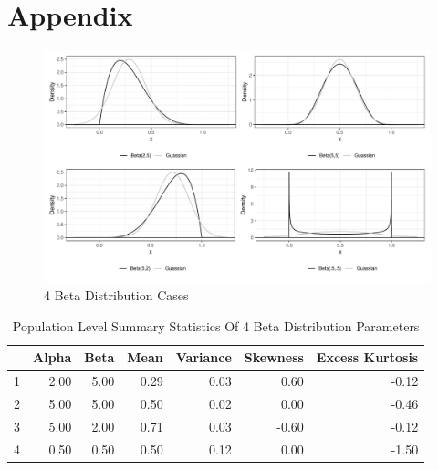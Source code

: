 \documentclass{article}\usepackage[]{graphicx}\usepackage[]{xcolor}
\begin{document}
\begin{multicols}{2}
\vspace{1em}


\begin{tiny}

\end{tiny}
\end{multicols}

\newpage
\onecolumn
\section{Appendix}

\begin{figure}[H]
  \begin{center}
  \includegraphics[width=\textwidth]{varying.beta.distributions.pdf}
  \caption{4 Beta Distribution Cases}
  \label{plot1}
  \end{center}
\end{figure}

\begin{table}[ht]
\centering
\caption{Population Level Summary Statistics Of 4 Beta Distribution Parameters}
\label{table1}
\begin{tabular}{rrrrrrr}
  \hline
 & Alpha & Beta & Mean & Variance & Skewness & Excess Kurtosis \\ 
  \hline
1 & 2.00 & 5.00 & 0.29 & 0.03 & 0.60 & -0.12 \\ 
  2 & 5.00 & 5.00 & 0.50 & 0.02 & 0.00 & -0.46 \\ 
  3 & 5.00 & 2.00 & 0.71 & 0.03 & -0.60 & -0.12 \\ 
  4 & 0.50 & 0.50 & 0.50 & 0.12 & 0.00 & -1.50 \\ 
   \hline
\end{tabular}
\end{table}
\end{document}

